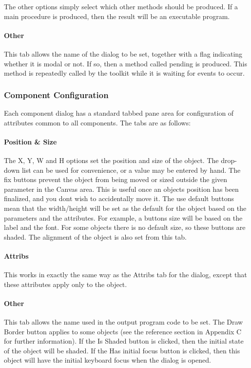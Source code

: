 The other options simply select which other methods should be produced.
If a main procedure is produced, then the result will be an executable
program.

\paragraph{Other}
This tab allows the name of the dialog to be set, together with a flag
indicating whether it is {\textquotedbl}modal{\textquotedbl} or not. If
so, then a method called pending is produced. This method is repeatedly
called by the toolkit while it is waiting for events to occur.

\subsubsection{Component Configuration}

Each component dialog has a standard tabbed pane area for configuration
of attributes common to all components. The tabs are as follows:

\paragraph{Position \& Size}
The X, Y, W and H options set the position and size of the object. The
drop-down list can be used for convenience, or a value may be entered
by hand. The {\textquotedbl}fix{\textquotedbl} buttons prevent the
object from being moved or sized outside the given parameter in the
Canvas area. This is useful once an object{\textquotesingle}s position
has been finalized, and you don{\textquotesingle}t wish to accidentally
move it. The {\textquotedbl}use default{\textquotedbl} buttons mean
that the width/height will be set as the default for the object based
on the parameters and the attributes. For example, a
button{\textquotesingle}s size will be based on the label and the font.
For some objects there is no default size, so these buttons are shaded.
The alignment of the object is also set from this tab.

\paragraph{Attribs}
This works in exactly the same way as the Attribs tab for the dialog,
except that these attributes apply only to the object.

\paragraph{Other}
This tab allows the name used in the output program code to be set.
The {\textquotedbl}Draw
Border{\textquotedbl} button applies to some objects (see the reference
section in Appendix C for further information). If the
{\textquotedbl}Is Shaded{\textquotedbl} button is clicked, then the
initial state of the object will be shaded. If the {\textquotedbl}Has
initial focus{\textquotedbl} button is clicked, then this object will
have the initial keyboard focus when the dialog is
opened.


